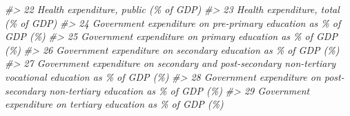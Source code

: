 \documentclass[
  xelatex, ja=standard]{bxjsbook}
\newenvironment{Shaded}{\begin{snugshade}}{\end{snugshade}}
\newcommand{\CommentTok}[1]{\textcolor[rgb]{0.56,0.35,0.01}{\textit{#1}}}
\theoremstyle{definition}
\theoremstyle{definition}
\theoremstyle{definition}
\theoremstyle{definition}
\theoremstyle{remark}
\begin{document}
\begin{Shaded}
\begin{Highlighting}[]
\CommentTok{\#\textgreater{} 22                                                                    Health expenditure, public (\% of GDP)}
\CommentTok{\#\textgreater{} 23                                                                     Health expenditure, total (\% of GDP)}
\CommentTok{\#\textgreater{} 24                                          Government expenditure on pre{-}primary education as \% of GDP (\%)}
\CommentTok{\#\textgreater{} 25                                              Government expenditure on primary education as \% of GDP (\%)}
\CommentTok{\#\textgreater{} 26                                            Government expenditure on secondary education as \% of GDP (\%)}
\CommentTok{\#\textgreater{} 27 Government expenditure on secondary and post{-}secondary non{-}tertiary vocational education as \% of GDP (\%)}
\CommentTok{\#\textgreater{} 28                          Government expenditure on post{-}secondary non{-}tertiary education as \% of GDP (\%)}
\CommentTok{\#\textgreater{} 29                                             Government expenditure on tertiary education as \% of GDP (\%)}
\end{Highlighting}
\end{Shaded}
\end{document}
